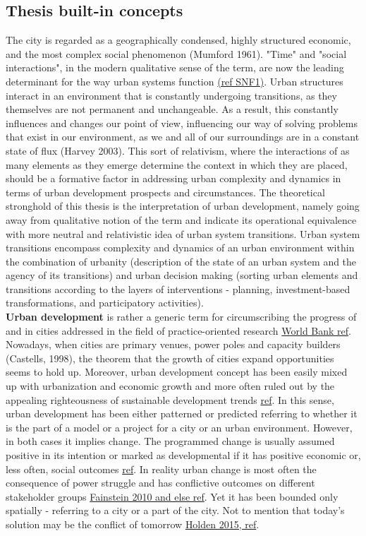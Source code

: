 \documentclass[11pt]{report}
\begin{document}
\subsection{Thesis built-in concepts}
The city is regarded as a geographically condensed, highly structured economic, and the most complex social phenomenon (Mumford 1961). "Time" and "social interactions", in the modern qualitative sense of the term, are now the leading determinant for the way urban systems function \href{}{(ref SNF1)}. Urban structures interact in an environment that is constantly undergoing transitions, as they themselves are not permanent and unchangeable. As a result, this constantly influences and changes our point of view, influencing our way of solving problems that exist in our environment, as we and all of our surroundings are in a constant state of flux (Harvey 2003). This sort of relativism, where the interactions of as many elements as they emerge determine the context in which they are placed, should be a formative factor in addressing urban complexity and dynamics in terms of urban development prospects and circumstances. The theoretical stronghold of this thesis is the interpretation of urban development, namely going away from qualitative notion of the term and indicate its operational equivalence with more neutral and relativistic idea of urban system transitions. Urban system transitions encompass complexity and dynamics of an urban environment within the combination of urbanity (description of the state of an urban system and the agency of its transitions) and urban decision making (sorting urban elements and transitions according to the layers of interventions - planning, investment-based transformations, and participatory activities).
\\ 
\textbf{Urban development} is rather a generic term for circumscribing the progress of and in cities addressed in the  field of practice-oriented research \href{}{World Bank ref}. Nowadays, when cities are primary venues, power poles and capacity builders (Castells, 1998), the theorem that the growth of cities expand opportunities seems to hold up. Moreover, urban development concept has been easily mixed up with urbanization and economic growth and more often ruled out by the appealing righteousness of sustainable development trends \href{}{ref}.  In this sense, urban development has been either patterned or predicted referring to whether it is the part of a model or a project for a city or an urban environment. However, in both cases it implies change. The programmed change is usually assumed positive in its intention or marked as developmental if it has positive economic or, less often, social outcomes \href{}{ref}. In reality urban change is most often the consequence of power struggle and has conflictive outcomes on different stakeholder groups \href{}{Fainstein 2010 and else ref}. Yet it has been bounded only spatially - referring to a city or a part of the city. Not to mention that today's solution may be the conflict of tomorrow \href{}{Holden 2015, ref}.
\end{document}
